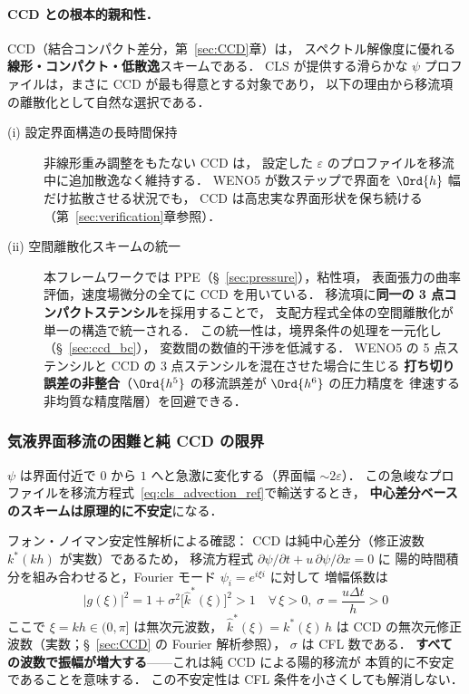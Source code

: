 \paragraph{CCD との根本的親和性．}
CCD（結合コンパクト差分，第~\ref{sec:CCD}章）は，
スペクトル解像度に優れる\textbf{線形・コンパクト・低散逸}スキームである．
CLS が提供する滑らかな $\psi$ プロファイルは，まさに CCD が最も得意とする対象であり，
以下の理由から移流項の離散化として自然な選択である．

\begin{description}
  \item[\upshape(i) 設定界面構造の長時間保持]
        非線形重み調整をもたない CCD は，
        設定した $\varepsilon$ のプロファイルを移流中に追加散逸なく維持する．
        WENO5 が数ステップで界面を $\Ord{h}$ 幅だけ拡散させる状況でも，
        CCD は高忠実な界面形状を保ち続ける（第~\ref{sec:verification}章参照）．
  \item[\upshape(ii) 空間離散化スキームの統一]
        本フレームワークでは PPE（§~\ref{sec:pressure}），粘性項，
        表面張力の曲率評価，速度場微分の全てに CCD を用いている．
        移流項に\textbf{同一の 3 点コンパクトステンシル}を採用することで，
        支配方程式全体の空間離散化が単一の構造で統一される．
        この統一性は，境界条件の処理を一元化し（§~\ref{sec:ccd_bc}），
        変数間の数値的干渉を低減する．
        WENO5 の 5 点ステンシルと CCD の 3 点ステンシルを混在させた場合に生じる
        \textbf{打ち切り誤差の非整合}（$\Ord{h^5}$ の移流誤差が $\Ord{h^6}$ の圧力精度を
        律速する非均質な精度階層）を回避できる．
\end{description}

\subsubsection{気液界面移流の困難と純 CCD の限界}
\label{sec:advection_ccd_limit}

$\psi$ は界面付近で $0$ から $1$ へと急激に変化する（界面幅 $\sim 2\varepsilon$）．
この急峻なプロファイルを移流方程式~\eqref{eq:cls_advection_ref}で輸送するとき，
\textbf{中心差分ベースのスキームは原理的に不安定}になる．

フォン・ノイマン安定性解析による確認：
CCD は純中心差分（修正波数 $k^*(kh)$ が実数）であるため，
移流方程式 $\partial\psi/\partial t + u\,\partial\psi/\partial x = 0$ に
陽的時間積分を組み合わせると，Fourier モード $\psi_i = e^{i\xi i}$ に対して
増幅係数は
\begin{equation}
  |g(\xi)|^2 = 1 + \sigma^2 \bigl[\hat{k}^*(\xi)\bigr]^2 > 1
  \quad \forall\, \xi > 0, \;\sigma = \frac{u\Delta t}{h} > 0
  \label{eq:ccd_adv_instability}
\end{equation}
ここで $\xi = kh \in (0,\pi]$ は無次元波数，
$\hat{k}^*(\xi) = k^*(\xi)\,h$ は CCD の無次元修正波数（実数；§~\ref{sec:CCD} の Fourier 解析参照），
$\sigma$ は CFL 数である．
\textbf{すべての波数で振幅が増大する}——これは純 CCD による陽的移流が
本質的に不安定であることを意味する．
この不安定性は CFL 条件を小さくしても解消しない．

